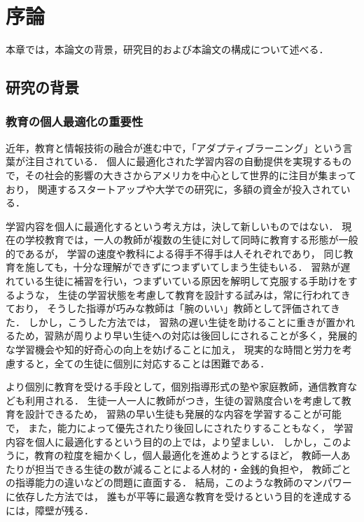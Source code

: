 \chapter{序論}
\label{chap:intro}
\fancyhf{}
\rhead{\thepage}
\cfoot{\thepage}

本章では，本論文の背景，研究目的および本論文の構成について述べる．


\section{研究の背景}

\subsection{教育の個人最適化の重要性}
近年，教育と情報技術の融合が進む中で，「アダプティブラーニング」という言葉が注目されている．
個人に最適化された学習内容の自動提供を実現するもので，その社会的影響の大きさからアメリカを中心として世界的に注目が集まっており，
関連するスタートアップや大学での研究に，多額の資金が投入されている\cite{piccioli2014learning}．

学習内容を個人に最適化するという考え方は，決して新しいものではない．
現在の学校教育では，一人の教師が複数の生徒に対して同時に教育する形態が一般的であるが，
学習の速度や教科による得手不得手は人それぞれであり，
同じ教育を施しても，十分な理解ができずにつまずいてしまう生徒もいる．
習熟が遅れている生徒に補習を行い，つまずいている原因を解明して克服する手助けをするような，
生徒の学習状態を考慮して教育を設計する試みは，常に行われてきており，
そうした指導が巧みな教師は「腕のいい」教師として評価されてきた．
しかし，こうした方法では，
習熟の遅い生徒を助けることに重きが置かれるため，習熟が周りより早い生徒への対応は後回しにされることが多く，発展的な学習機会や知的好奇心の向上を妨げることに加え，
現実的な時間と労力を考慮すると，全ての生徒に個別に対応することは困難である．

より個別に教育を受ける手段として，個別指導形式の塾や家庭教師，通信教育なども利用される．
生徒一人一人に教師がつき，生徒の習熟度合いを考慮して教育を設計できるため，
習熟の早い生徒も発展的な内容を学習することが可能で，
また，能力によって優先されたり後回しにされたりすることもなく，
学習内容を個人に最適化するという目的の上では，より望ましい．
しかし，このように，教育の粒度を細かくし，個人最適化を進めようとするほど，
教師一人あたりが担当できる生徒の数が減ることによる人材的・金銭的負担や，
教師ごとの指導能力の違いなどの問題に直面する．
結局，このような教師のマンパワーに依存した方法では，
誰もが平等に最適な教育を受けるという目的を達成するには，障壁が残る．


